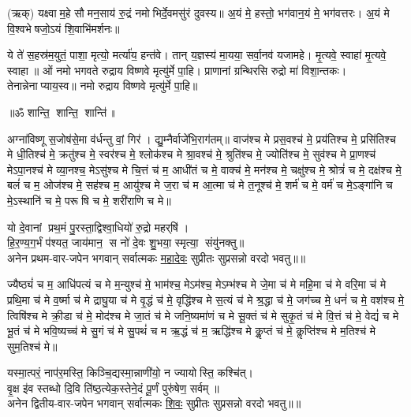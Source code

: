 (ऋक्)   यक्ष्वाम॒हे सौमन॒साय॑ रु॒द्रं नमोभिर्दे॒वमसु॑रं दुवस्य॥ अ॒यं मे॒ हस्तो॒ भग॑वान॒यं मे॒ भग॑वत्तरः। अ॒यं मे वि॒श्वभेषजो॒ऽयं शि॒वाभि॑मर्शनः॥

ये ते॑ स॒हस्र॑म॒युतं॒ पाशा॒ मृत्यो॒ मर्त्या॑य॒ हन्त॑वे। तान् य॒ज्ञस्य॑ मा॒यया॒ सर्वा॒नव॑ यजामहे। मृ॒त्यवे॒ स्वाहा॑ मृ॒त्यवे॒ स्वाहा॥ ओं नमो भगवते रुद्राय विष्णवे मृत्यु॑र्मे पा॒हि। प्राणानां ग्रन्थिरसि रुद्रो मा॑ विशा॒न्तकः। तेनान्नेनाप्याय॒स्व॥ नमो रुद्राय विष्णवे मृत्यु॑र्मे पा॒हि॥\rbrack
 
\centerline{॥ॐ शान्ति॒ शान्ति॒ शान्ति॑॥}

{\small \closesection}

\newcommand{\cham}[3]{\refstepcounter{cj}%
#1\\
अनेन #2-वार-जपेन भगवान् सर्वात्मकः \underline{#3} सुप्रीतः सुप्रसन्नो वरदो भवतु॥\devanumber{\arabic{cj}}॥}

अग्ना॑विष्णू स॒जोष॑से॒मा व॑र्धन्तु वां॒ गिर॑। द्यु॒म्नैर्वाजे॑भि॒रा\-ग॑तम्॥ 
वाज॑श्च मे प्रस॒वश्च॑ मे॒ प्रय॑तिश्च मे॒ प्रसि॑तिश्च मे धी॒तिश्च॑ मे॒ क्रतु॑श्च मे॒ स्वर॑श्च मे॒ श्लोक॑श्च मे श्रा॒वश्च॑ मे॒ श्रुति॑श्च मे॒ ज्योति॑श्च मे॒ सुव॑श्च मे प्रा॒णश्च॑ मेऽपा॒नश्च॑ मे व्या॒नश्च॒ मेऽसु॑श्च मे चि॒त्तं च॑ म॒ आधी॑तं च मे॒ वाक्च॑ मे॒ मन॑श्च मे॒ चक्षु॑श्च मे॒ श्रोत्रं॑ च मे॒ दक्ष॑श्च मे॒ बलं॑ च म॒ ओज॑श्च मे॒ सह॑श्च म॒ आयु॑श्च मे ज॒रा च॑ म आ॒त्मा च॑ मे त॒नूश्च॑ मे॒ शर्म॑ च मे॒ वर्म॑ च मे॒ऽङ्गा॑नि च मे॒ऽस्थानि॑ च मे॒ परूषि च मे॒ शरी॑राणि च मे॥

\cham{यो दे॒वानां प्रथ॒मं पु॒रस्ता॒द्विश्वा॒धियो॑ रु॒द्रो महर्‌षि॑।\\
हि॒र॒ण्य॒ग॒र्भं प॑श्यत॒ जाय॑मान॒ स नो॑ दे॒वः शु॒भया॒ स्मृत्या॒ संयु॑नक्तु॥}{प्रथम}{महादेवः}

ज्यैष्ठ्यं॑ च म॒ आधि॑पत्यं च मे म॒न्युश्च॑ मे॒ भाम॑श्च॒ मेऽम॑श्च॒ मेऽम्भ॑श्च मे जे॒मा च॑ मे महि॒मा च॑ मे वरि॒मा च॑ मे प्रथि॒मा च॑ मे व॒र्ष्मा च॑ मे द्राघु॒या च॑ मे वृ॒द्धं च॑ मे॒ वृद्धि॑श्च मे स॒त्यं च॑ मे श्र॒द्धा च॑ मे॒ जग॑च्च मे॒ धनं॑ च मे॒ वश॑श्च मे॒ त्विषि॑श्च मे क्री॒डा च॑ मे॒ मोद॑श्च मे जा॒तं च॑ मे जनि॒ष्यमा॑णं च मे सू॒क्तं च॑ मे सुकृ॒तं च॑ मे वि॒त्तं च॑ मे॒ वेद्यं॑ च मे भू॒तं च॑ मे भवि॒ष्यच्च॑ मे सु॒गं च॑ मे सु॒पथं॑ च म ऋ॒द्धं च॑ म॒ ऋद्धि॑श्च मे कॢ॒प्तं च॑ मे॒ कॢप्ति॑श्च मे म॒तिश्च॑ मे सुम॒तिश्च॑ मे॥

\cham{यस्मा॒त्परं॒ नाप॑र॒मस्ति॒ किञ्चि॒द्यस्मा॒न्नाणी॑यो॒ न ज्यायोस्ति॒ कश्चि॑त्।\\
वृ॒क्ष इ॑व स्तब्धो दि॒वि ति॑ष्ठ॒त्येक॒स्तेने॒दं पू॒र्णं पुरु॑षेण॒ सर्वम्॥}{द्वितीय}{शिवः}

